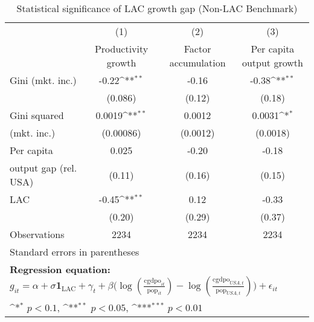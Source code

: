 \begin{table}[htbp]\centering
\def\sym#1{\ifmmode^{#1}\else\(^{#1}\)\fi}
\caption{Statistical significance of LAC growth gap (Non-LAC Benchmark)}
\begin{tabular}{l*{3}{c}}
\toprule
                &\multicolumn{1}{c}{(1)}&\multicolumn{1}{c}{(2)}&\multicolumn{1}{c}{(3)}\\
                &\multicolumn{1}{c}{Productivity growth}&\multicolumn{1}{c}{Factor accumulation}&\multicolumn{1}{c}{Per capita output growth}\\
\midrule
Gini (mkt. inc.)&    -0.22\sym{**} &    -0.16         &    -0.38\sym{**} \\
                &  (0.086)         &   (0.12)         &   (0.18)         \\
\addlinespace
Gini squared    &   0.0019\sym{**} &   0.0012         &   0.0031\sym{*}  \\
(mkt. inc.)     &(0.00086)         & (0.0012)         & (0.0018)         \\
\addlinespace
Per capita      &    0.025         &    -0.20         &    -0.18         \\
output gap (rel. USA)&   (0.11)         &   (0.16)         &   (0.15)         \\
\addlinespace
LAC             &    -0.45\sym{**} &     0.12         &    -0.33         \\
                &   (0.20)         &   (0.29)         &   (0.37)         \\
\midrule
Observations    &     2234         &     2234         &     2234         \\
\bottomrule
\multicolumn{4}{l}{\footnotesize Standard errors in parentheses}\\
\multicolumn{4}{l}{\footnotesize \textbf{Regression equation:} \(g_{it} = \alpha + \sigma \mathbf{1}_{\textrm{LAC}} + \gamma_t + \beta \big(\log (\frac{\textrm{cgdpo}_{it}}{\textrm{pop}_{it}} ) - \log (\frac{\textrm{cgdpo}_{USA,t}}{\textrm{pop}_{USA,t}}  ) \big) + \epsilon_{it}\)}\\
\multicolumn{4}{l}{\footnotesize \sym{*} \(p<0.1\), \sym{**} \(p<0.05\), \sym{***} \(p<0.01\)}\\
\end{tabular}
\end{table}
